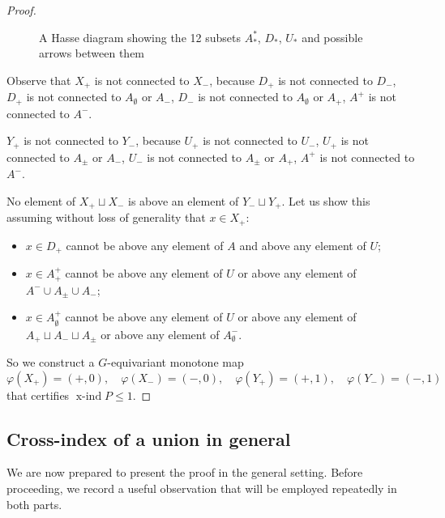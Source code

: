 \documentclass[preprint,12pt]{article}
\renewcommand{\le}{\leqslant}
\theoremstyle{definition}
\theoremstyle{remark}
\numberwithin{equation}{section}
\DeclareMathOperator{\xind}{x-ind}
\renewcommand{\phi}{\varphi}
\begin{document}
\begin{proof}
\begin{figure}[h!]
    \caption{A Hasse diagram showing the 12 subsets $A_*^*$, $D_*$, $U_*$ and possible arrows between them}
    \label{fig:mu(Z_2)=1}
\end{figure}
    
    Observe that $X_+$ is not connected to $X_-$, because $D_+$ is not connected to $D_-$, $D_+$ is not connected to $A_\emptyset$ or $A_-$, $D_-$ is not connected to $A_\emptyset$ or $A_+$, $A^+$ is not connected to $A^-$.
    
    $Y_+$ is not connected to $Y_-$, because $U_+$ is not connected to $U_-$, $U_+$ is not connected to $A_\pm$ or $A_-$, $U_-$ is not connected to $A_\pm$ or $A_+$, $A^+$ is not connected to $A^-$.
    
    No element of $X_+\sqcup X_-$ is above an element of $Y_-\sqcup Y_+$. Let us show this assuming without loss of generality that $x\in X_+$:
    \begin{itemize}
    \item
    $x\in D_+$ cannot be above any element of $A$ and above any element of $U$;
    \item
    $x\in A_+^+$ cannot be above any element of $U$ or above any element of $A^-\cup A_\pm\cup A_-$;
    \item
    $x\in A_\emptyset^+$ cannot be above any element of $U$ or above any element of $A_+\sqcup A_-\sqcup A_\pm$ or above any element of $A_\emptyset^-$.
    \end{itemize}
    So we construct a $G$-equivariant monotone map
    \[
    \phi(X_+) = (+,0),\quad \phi(X_-) = (-,0),\quad \phi(Y_+) = (+,1),\quad \phi(Y_-) = (-,1)
    \]
    that certifies $\xind P\le 1$.
\end{proof}

\subsection{Cross-index of a union in general}

We are now prepared to present the proof in the general setting. Before proceeding, we record a useful observation that will be employed repeatedly in both parts. 
\end{document}
